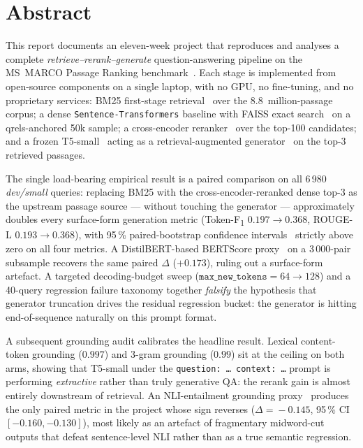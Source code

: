 \documentclass[11pt,a4paper]{article}
\newcommand{\devsmall}{\textit{dev/small}}
\newcommand{\fdev}{6\,980}
\newcommand{\msmarco}{MS~MARCO}
\newcommand{\F}{F\textsubscript{1}}
\newcommand{\Tokenf}{Token-\F}
\newcommand{\rougel}{ROUGE-L}
\newcommand{\bertscore}{BERTScore}
\newcommand{\bmtwofive}{BM25}
\newcommand{\code}[1]{\texttt{#1}}
\begin{document}
\newpage
\thispagestyle{empty}
\section*{Abstract}

This report documents an eleven-week project that
reproduces and analyses a complete \emph{retrieve--rerank--generate}
question-answering pipeline on the \msmarco{} Passage Ranking
benchmark~\cite{bajaj2016msmarco,nguyen2016msmarcoqa}.  Each stage is
implemented from open-source components on a single laptop, with no
GPU, no fine-tuning, and no proprietary services: \bmtwofive{}
first-stage retrieval~\cite{robertson2009bm25,lu2024bm25s} over the
8.8~million-passage corpus; a dense \texttt{Sentence-Transformers}
baseline with FAISS exact search~\cite{reimers2019sbert,johnson2019faiss}
on a qrels-anchored 50k sample; a cross-encoder
reranker~\cite{nogueira2019passage,wang2020minilm} over the top-100
candidates; and a frozen T5-small~\cite{raffel2020t5} acting as a
retrieval-augmented generator~\cite{lewis2020rag} on the top-3
retrieved passages.

The single load-bearing empirical result is a paired comparison on
all \fdev{} \devsmall{} queries: replacing \bmtwofive{} with the
cross-encoder-reranked dense top-3 as the upstream passage source ---
without touching the generator --- approximately doubles every
surface-form generation metric (\Tokenf{} $0.197 \to 0.368$, \rougel{}
$0.193 \to 0.368$), with 95\,\% paired-bootstrap
confidence intervals~\cite{koehn2004bootstrap} strictly above zero on
all four metrics.  A DistilBERT-based \bertscore{}
proxy~\cite{zhang2020bertscore,sanh2019distilbert} on a 3\,000-pair
subsample recovers the same paired $\Delta$ ($+0.173$), ruling out a
surface-form artefact.  A targeted decoding-budget sweep
($\code{max\_new\_tokens}=64\!\to\!128$) and a 40-query regression
failure taxonomy together \emph{falsify} the hypothesis that
generator truncation drives the residual regression bucket: the
generator is hitting end-of-sequence naturally on this prompt format.

A subsequent grounding audit calibrates the headline result.  Lexical
content-token grounding ($0.997$) and 3-gram grounding ($0.99$) sit
at the ceiling on both arms, showing that T5-small under the
\texttt{question: \ldots\ context: \ldots} prompt is performing
\emph{extractive} rather than truly generative QA: the rerank gain is
almost entirely downstream of retrieval.  An NLI-entailment grounding
proxy~\cite{he2023debertav3,williams2018mnli} produces the only
paired metric in the project whose sign reverses ($\Delta\!=\!-0.145$,
95\,\% CI $[-0.160,-0.130]$), most likely as an artefact of
fragmentary midword-cut outputs that defeat sentence-level NLI rather
than as a true semantic regression.
\end{document}

